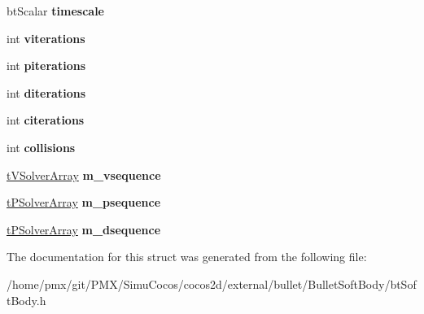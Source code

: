 \begin{DoxyCompactItemize}
bt\+Scalar {\bfseries timescale}
\item 
\mbox{\label{structbtSoftBody_1_1Config_aba421ab9d7267825bacabf8a0faa7e23}} 
int {\bfseries viterations}
\item 
\mbox{\label{structbtSoftBody_1_1Config_a281a562a273f8d02f9b7354aa1bf1c86}} 
int {\bfseries piterations}
\item 
\mbox{\label{structbtSoftBody_1_1Config_a2308fe57ad7f38ca9a2f5fe934156f6c}} 
int {\bfseries diterations}
\item 
\mbox{\label{structbtSoftBody_1_1Config_a120909b8c9563169d6457cc9e00a885d}} 
int {\bfseries citerations}
\item 
\mbox{\label{structbtSoftBody_1_1Config_a094682081f77f6351dfac8a73f00a046}} 
int {\bfseries collisions}
\item 
\mbox{\label{structbtSoftBody_1_1Config_ab62d23fc6f0ec2c4f2caea5f7d05c6cf}} 
\hyperlink{classbtAlignedObjectArray}{t\+V\+Solver\+Array} {\bfseries m\+\_\+vsequence}
\item 
\mbox{\label{structbtSoftBody_1_1Config_a48c3acf5e2f871a71cbc846b2ddc7b9d}} 
\hyperlink{classbtAlignedObjectArray}{t\+P\+Solver\+Array} {\bfseries m\+\_\+psequence}
\item 
\mbox{\label{structbtSoftBody_1_1Config_a631da7f0a187b150e30c8fa76e0bfb94}} 
\hyperlink{classbtAlignedObjectArray}{t\+P\+Solver\+Array} {\bfseries m\+\_\+dsequence}
\end{DoxyCompactItemize}


The documentation for this struct was generated from the following file\+:\begin{DoxyCompactItemize}
\item 
/home/pmx/git/\+P\+M\+X/\+Simu\+Cocos/cocos2d/external/bullet/\+Bullet\+Soft\+Body/bt\+Soft\+Body.\+h\end{DoxyCompactItemize}
